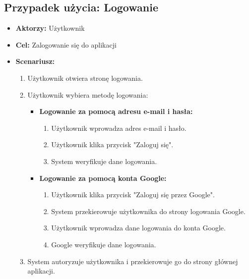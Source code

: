 \subsection{Przypadek użycia: Logowanie}
\begin{itemize}
    \item \textbf{Aktorzy:} Użytkownik
    \item \textbf{Cel:} Zalogowanie się do aplikacji
    \item \textbf{Scenariusz:}
          \begin{enumerate}
              \item Użytkownik otwiera stronę logowania.
              \item Użytkownik wybiera metodę logowania:
                    \begin{itemize}
                        \item \textbf{Logowanie za pomocą adresu e-mail i hasła:}
                              \begin{enumerate}
                                  \item Użytkownik wprowadza adres e-mail i hasło.
                                  \item Użytkownik klika przycisk "Zaloguj się".
                                  \item System weryfikuje dane logowania.
                              \end{enumerate}
                        \item \textbf{Logowanie za pomocą konta Google:}
                              \begin{enumerate}
                                  \item Użytkownik klika przycisk "Zaloguj się przez Google".
                                  \item System przekierowuje użytkownika do strony logowania Google.
                                  \item Użytkownik wprowadza dane logowania do konta Google.
                                  \item Google weryfikuje dane logowania.
                              \end{enumerate}
                    \end{itemize}
              \item System autoryzuje użytkownika i przekierowuje go do strony głównej aplikacji.
          \end{enumerate}
\end{itemize}

